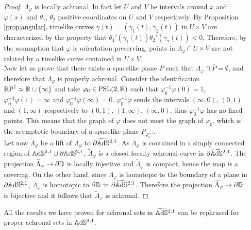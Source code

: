 \begin{proof}
    $\Lambda_\varphi$ is locally achronal. In fact let $U$ and $V$ be intervals around $x$ and $\varphi(x)$ and $\theta_1$, $\theta_2$ positive coordinates on $U$ and $V$ respectively. By Proposition \ref{prop:angular}, timelike curves $\gamma(t)=(\gamma_1(t),\gamma_2(t))$ in $U\times V$ are characterized by the property that $\theta_1'(\gamma_1(t))\theta_2'(\gamma_2(t)) < 0$. Therefore, by the assumption that $\varphi$ is orientation preserving, points in $\Lambda_\varphi \cap U\times V$ are not related by a timelike curve contained in $U \times V$.\\
    Now let us prove that there exists a spacelike plane $P$ such that $\Lambda_\varphi \cap \overline{P} = \emptyset$, and therefore that $\Lambda_\varphi$ is properly achronal. Consider the identification $\mathbb{R}\textup{P}^1 \simeq \mathbb{R} \cup \{ \infty \}$ and take $\varphi_0 \in \text{PSL}(2,\mathbb{R})$ such that $\varphi_0^{-1} \varphi (0) = 1$, $\varphi_0^{-1} \varphi (1) = \infty$ and $\varphi_0^{-1} \varphi (\infty) = 0$. $\varphi_0^{-1} \varphi$ sends the intervals $(\infty, 0)$, $(0,1)$ and $(1,\infty)$ respectively to $(0,1)$, $(1,\infty)$, $(\infty, 0)$, thus $\varphi_0^{-1} \varphi$ has no fixed points. This means that the graph of $\varphi$ does not meet the graph of $\varphi_0$, which is the asymptotic boundary of a spacelike plane $P_{\varphi_0^{-1}}$.\\
    Let now $\widetilde{\Lambda}_\varphi$ be a lift of $\Lambda_{\varphi}$ to $\partial\widetilde{\mathbb{A}\mathrm{d}\mathbb{S}}{}^{2,1}$. As $\Lambda_\varphi$ is contained in a simply connected region of $\mathbb{A}\mathrm{d}\mathbb{S}^{2,1} \cup \partial\mathbb{A}\mathrm{d}\mathbb{S}^{2,1}$, $\widetilde{\Lambda}_\varphi$ is a closed locally achronal curve in $\partial\widetilde{\mathbb{A}\mathrm{d}\mathbb{S}}{}^{2,1}$. The projection $\widetilde{\Lambda}_\varphi \to \partial\mathbb{D}$ is locally injective and $\widetilde{\Lambda}_\varphi$ is compact, hence the map is a covering. On the other hand, since $\Lambda_\varphi$ is homotopic to the boundary of a plane in $\partial\mathbb{A}\mathrm{d}\mathbb{S}^{2,1}$, $\widetilde{\Lambda}_\varphi$ is homotopic to $\partial\mathbb{D}$ in $\partial\widetilde{\mathbb{A}\mathrm{d}\mathbb{S}}{}^{2,1}$. Therefore the projection $\widetilde{\Lambda}_\varphi \to \partial\mathbb{D}$ is bijective and it follows that $\widetilde{\Lambda}_\varphi$ is achronal.
\end{proof}

\begin{observation}
    All the results we have proven for achronal sets in $\widetilde{\mathbb{A}\mathrm{d}\mathbb{S}}{}^{2,1}$ can be rephrased for proper achronal sets in $\mathbb{A}\mathrm{d}\mathbb{S}^{2,1}$.
\end{observation}

